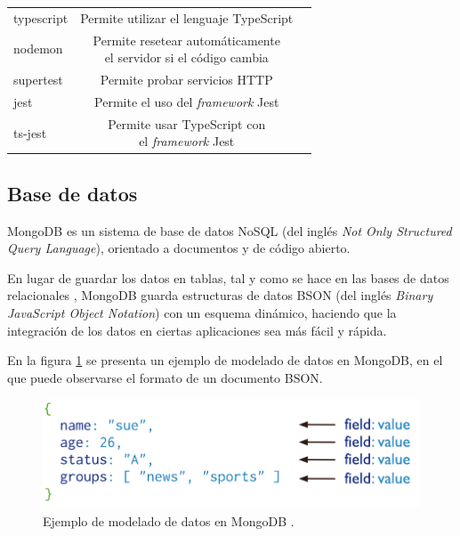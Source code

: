 \begin{table}[H]
\begin{tabular}{l c c}
		typescript \citep{WEBSITE:TYPESCRIPTLIBRARY} & Permite utilizar el lenguaje TypeScript \\
		nodemon \citep{WEBSITE:NODEMON} & \shortstack{Permite resetear automáticamente \\ el servidor si el código cambia} \\	
		supertest \citep{WEBSITE:SUPERTEST} & Permite probar servicios HTTP \\
		jest \citep{WEBSITE:JESTLIBRARY} & Permite el uso del \emph{framework} Jest \\
		ts-jest \citep{WEBSITE:TSJEST}& \shortstack{Permite usar TypeScript con \\ el \emph{framework} Jest} \\
		\bottomrule
		\hline
	\end{tabular}
	\label{tab:tablaBibliotecasNodejs}
\end{table}

\subsection{Base de datos}

MongoDB \citep{WEBSITE:MONGODB} es un sistema de base de datos NoSQL (del inglés \textit{Not Only Structured Query Language})\citep{WEBSITE:NOSQL}, orientado a documentos \citep{WEBSITE:BASEDEDATOSDOCUMENTAL} y de código abierto.

En lugar de guardar los datos en tablas, tal y como se hace en las bases de datos relacionales \citep{WEBSITE:BASEDEDATOSRELACIONAL}, MongoDB guarda estructuras de datos BSON (del inglés \textit{Binary JavaScript Object Notation}) \citep{WEBSITE:BSON} con un esquema dinámico, haciendo que la integración de los datos en ciertas aplicaciones sea más fácil y rápida. 

En la figura \ref{fig:ejemploDeModeladoDeDatosEnMongoDB} se presenta un ejemplo de modelado de datos en MongoDB, en el que puede observarse el formato de un documento BSON.

\begin{figure}[H]
	\centering
	\includegraphics[width=.8\textwidth]{./Figures/Ejemplo de modelado de datos en MongoDB.png}
	\caption{Ejemplo de modelado de datos en MongoDB \protect\footnotemark.}
	\label{fig:ejemploDeModeladoDeDatosEnMongoDB}
\end{figure}

